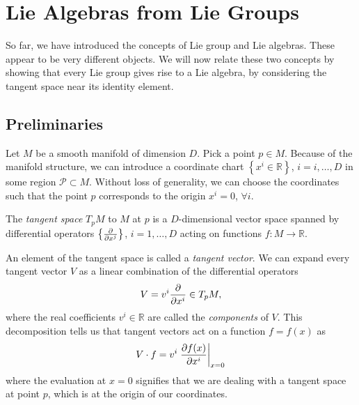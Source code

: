 
\chapter{Lie Algebras from Lie Groups}%
\label{cha:lie_algebras_from_lie_groups}

So far, we have introduced the concepts of Lie group and Lie algebras.
These appear to be very different objects. We will now relate these two concepts by showing that every Lie group gives rise to a Lie algebra, by considering the tangent space near its identity element.

\section{Preliminaries}%
\label{sec:preliminaries}

Let $M$ be a smooth manifold of dimension $D$. Pick a point $p \in M$.
Because of the manifold structure, we can introduce a coordinate chart $\left\{ x^i \in \mathbb{R} \right\}$, $i = i, \ldots, D$ in some region $\mathcal{P} \subset M$.
Without loss of generality, we can choose the coordinates such that the point $p$ corresponds to the origin $x^i = 0$, $\forall i$.

\begin{definition}
  The \emph{tangent space} $T_p M$ to $M$ at $p$ is a $D$-dimensional vector space spanned by differential operators $\left\{ \pdv{}{x^j} \right\}$, $i = 1, \ldots, D$ acting on functions $f: M \to \mathbb{R}$.
\end{definition}

\begin{definition}
  An element of the tangent space is called a \emph{tangent vector}. We can expand every tangent vector $V$ as a linear combination of the differential operators
  \begin{equation}
    V = v^i \pdv{}{x^i} \in T_p  M,
  \end{equation}
  where the real coefficients $v^i \in \mathbb{R}$ are called the \emph{components} of $V$.
  This decomposition tells us that tangent vectors act on a function $f = f(x)$ as
  \begin{equation}
    V \cdot f = v^i \left.\pdv{f(x)}{x^i} \right\rvert_{x = 0}
  \end{equation}
  where the evaluation at $x = 0$ signifies that we are dealing with a tangent space at point $p$, which is at the origin of our coordinates.
\end{definition}

